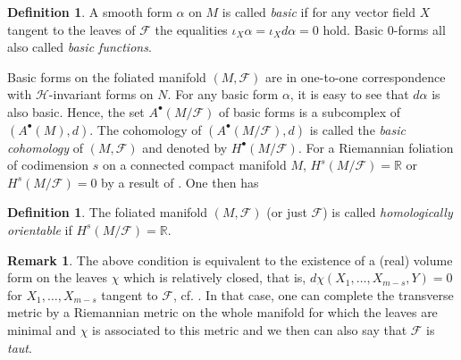 \documentclass[12pt]{amsart}
\numberwithin{equation}{section}
\theoremstyle{definition}
\theoremstyle{definition}
\newtheorem{definition}  [theorem]     {Definition}
\theoremstyle{definition}
\newtheorem{remark}  [theorem]     {Remark}
\renewcommand{\1}{\mathsf{1}}
\renewcommand{\>}{\rightarrow}
\def\mb{\mathbb}
\def\mc{\mathcal}
\theoremstyle{plain} %
\theoremstyle{plain} %
\theoremstyle{plain} %
\begin{document}
	
	
	\begin{definition}
		A smooth form $\alpha$ on $M$ is called \textit{basic} if for any vector field $X$ tangent to the leaves of $\mc F$ the equalities
		$\iota_X\alpha=\iota_X{d\alpha}=0$ hold.
		Basic $0$-forms all also called \emph{basic functions}.
	\end{definition}
	
	Basic forms on the foliated manifold $(M,\mc F)$ are in one-to-one correspondence with $\mc H$-invariant forms on $N$. For any basic form $\alpha$, it is easy to see that $d\alpha$ is also basic. Hence, the set $A^\bullet (M/\mathcal{F})$ of basic forms is a subcomplex of $(A^\bullet(M),d).$ The  cohomology of $(A^\bullet (M/\mathcal{F}),d)$ is called the \textit{basic cohomology} of $(M,\mathcal{F})$ and denoted by $H^\bullet (M/\mathcal{F})$. %
	For a Riemannian foliation of codimension $s$ on a connected compact manifold $M$, $H^{s}(M/\mc F)=\mb  R$ or $H^{s}(M/\mc F)=0$ by a result of \cite{EKASH85}. One then has
	\begin{definition}\label{homolo}
		The foliated manifold $(M,\mc F)$ (or just $\mc F$) is called \textit{homologically orientable}  if $H^{s}(M/\mc F)=\mb  R$.
	\end{definition}
	\begin{remark}\label{taut}
		The above condition is equivalent to the existence of a (real) volume form on the leaves $\chi$ which is relatively closed, that is, $d\chi(X_1,\ldots,X_{m-s},Y)=0$ for $X_1,\ldots,X_{m-s}$ tangent to $\mc F$, cf. \cite{Ru79}. In that case, one can complete the transverse metric by  a Riemannian metric on the whole manifold for which the leaves are minimal and $\chi$ is associated to this metric and we then can also say that $\mc F$ is \textit{taut}.
	\end{remark}
	
\end{document}
